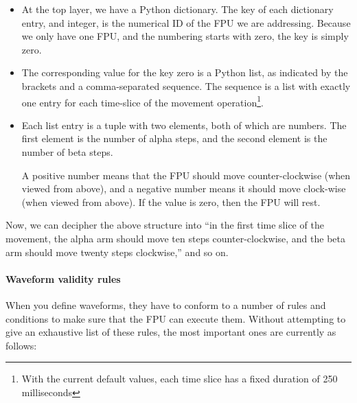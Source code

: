 \documentclass{scrartcl}[12pt,a4paper]
\begin{document}
\begin{itemize}
  
\item At the top layer, we have a Python dictionary.  The key of each
  dictionary entry, and integer, is the numerical ID of the FPU we are
  addressing.  Because we only have one FPU, and the numbering starts
  with zero, the key is simply zero.

\item The corresponding value for the key zero is a Python list, as
  indicated by the brackets and a comma-separated sequence. The
  sequence is a list with exactly one entry for each time-slice of the
  movement operation\footnote{With the current default values,
  each time slice has a fixed duration of 250 milliseconds}.

\item Each list entry is a tuple with two elements, both of which are
  numbers. The first element is the number of alpha steps, and the
  second element is the number of beta steps.

  A positive number means that the FPU should move counter-clockwise
  (when viewed from above), and a negative number means it should move
  clock-wise (when viewed from above). If the value is zero, then the
  FPU will rest.

\end{itemize}

Now, we can decipher the above structure into ``in the first time
slice of the movement, the alpha arm should move ten steps
counter-clockwise, and the beta arm should move twenty steps
clockwise,'' and so on.

\paragraph{Waveform validity rules}

When you define waveforms, they have to conform to a
number of rules and conditions to make sure that the
FPU can execute them. Without attempting to give an
exhaustive list of these rules, the most important
ones are currently as follows:
\end{document}
